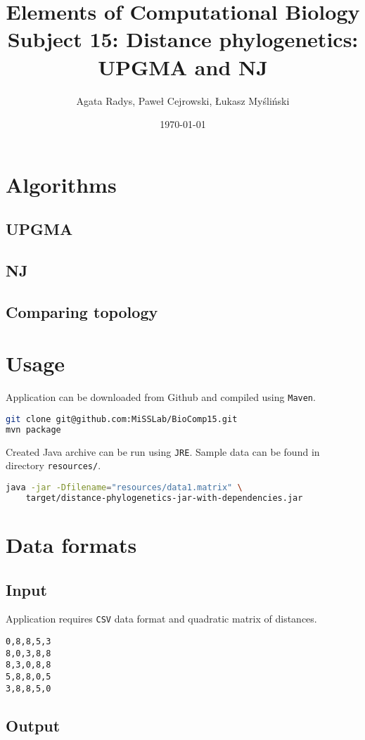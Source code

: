 \documentclass[a4paper,10pt]{article}
\title{Elements of Computational Biology\\ \Large
Subject 15: Distance phylogenetics: UPGMA and NJ}
\author{Agata Radys, Paweł Cejrowski, Łukasz Myśliński}
\date{\today}
\begin{document}
\maketitle

\section{Algorithms}

\subsection{UPGMA}
\subsection{NJ}
\subsection{Comparing topology}

\section{Usage}
Application can be downloaded from Github and compiled using \texttt{Maven}.
\begin{lstlisting}[language=bash,caption={Building project}]
git clone git@github.com:MiSSLab/BioComp15.git
mvn package
\end{lstlisting}
Created Java archive can be run using \texttt{JRE}. Sample data can be found in directory \texttt{resources/}.
\begin{lstlisting}[language=bash,caption={Running project using data1.matrix}]
java -jar -Dfilename="resources/data1.matrix" \
    target/distance-phylogenetics-jar-with-dependencies.jar
\end{lstlisting}

\section{Data formats}
\subsection{Input}
Application requires \texttt{CSV} data format and quadratic matrix of distances.

\begin{lstlisting}[caption={Example data file content}]
0,8,8,5,3
8,0,3,8,8
8,3,0,8,8
5,8,8,0,5
3,8,8,5,0
\end{lstlisting}

\subsection{Output}
\end{document}
